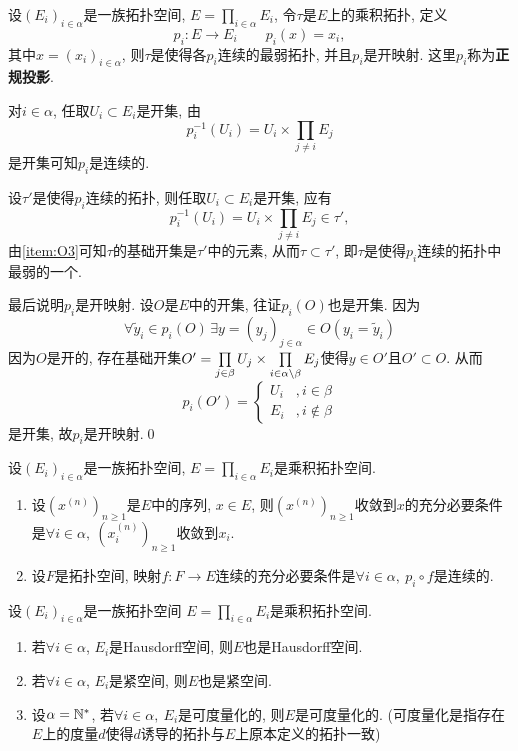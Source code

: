 	\begin{Theorem}
	设$ (E_i)_{i\in\alpha} $是一族拓扑空间, $ E=\prod_{i\in\alpha}E_i $, 令$ \tau $是$ E $上的乘积拓扑, 定义
	\[
	p_i : E\to E_i\qquad p_i(x)=x_i,
	\]
	其中$ x=(x_i)_{i\in\alpha} $, 则$ \tau $是使得各$ p_i $连续的最弱拓扑, 并且$ p_i $是开映射. 这里$ p_i $称为\textbf{正规投影}.
	\end{Theorem}
	\begin{Proof}
	对$ i\in\alpha $, 任取$ U_i\subset E_i $是开集, 由
	\[
	p_i^{-1}(U_i)=U_i\times\prod_{j\ne i}E_j
	\]
	是开集可知$ p_i $是连续的.
	
	设$ \tau' $是使得$ p_i $连续的拓扑, 则任取$ U_i\subset E_i $是开集, 应有
	\[
	p_i^{-1}(U_i)=U_i\times\prod_{j\ne i}E_j\in\tau',
	\]
	由\ref{item:O3}可知$ \tau $的基础开集是$ \tau' $中的元素, 从而$ \tau\subset\tau' $, 即$ \tau $是使得$ p_i $连续的拓扑中最弱的一个.
	
	最后说明$ p_i $是开映射. 设$ O $是$ E $中的开集, 往证$ p_i(O) $也是开集. 因为
	\[
	\forall \tilde{y}_i\in p_i(O)\,\exists y=(y_j)_{j\in\alpha}\in O(y_i=\tilde{y}_i)
	\]
	因为$ O $是开的, 存在基础开集$ O'=\prod\limits_{j\in\beta}U_j\times\prod\limits_{i\in\alpha\setminus\beta}E_j $使得$ y\in O' $且$ O'\subset O $. 从而
	\[
	p_i(O')=\begin{cases}
	U_i & ,i\in\beta\\ E_i &, i\notin\beta
	\end{cases}
	\]
	是开集, 故$ p_i $是开映射.\qed
	\end{Proof}
	
	\begin{Corollary}
	设$ (E_i)_{i\in\alpha} $是一族拓扑空间, $ E=\prod\limits_{i\in\alpha}E_i $是乘积拓扑空间.
	\begin{enumerate}[(1)]
	\item 设$ (x^{(n)})_{n\geqslant 1} $是$ E $中的序列, $ x\in E $, 则$ (x^{(n)})_{n\geqslant 1} $收敛到$ x $的充分必要条件是$\forall i\in\alpha,\  (x_i^{(n)})_{n\geqslant 1} $收敛到$ x_i $.
	
	\item 设$ F $是拓扑空间, 映射$ f : F\to E $连续的充分必要条件是$ \forall i\in\alpha,\ p_i\circ f $是连续的.
	\end{enumerate}
	\end{Corollary}
	
	\begin{Proposition}\label{prop:乘积拓扑空间的继承性质}
	设$ (E_i)_{i\in\alpha} $是一族拓扑空间 $ E=\prod\limits_{i\in\alpha}E_i $是乘积拓扑空间.
	\begin{enumerate}[(1)]
	\item 若$ \forall i\in\alpha $, $ E_i $是Hausdorff空间, 则$ E $也是Hausdorff空间.
	
	\item 若$ \forall i\in\alpha $, $ E_i $是紧空间, 则$ E $也是紧空间.
	
	\item 设$ \alpha=\mathbb{N}^\ast $, 若$ \forall i\in\alpha,\ E_i $是可度量化的, 则$ E $是可度量化的. (可度量化是指存在$ E $上的度量$ d $使得$ d $诱导的拓扑与$ E $上原本定义的拓扑一致)
	\end{enumerate}
	\end{Proposition}
	

